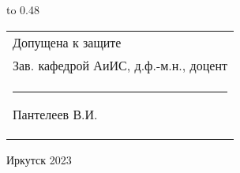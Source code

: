 \vspace{0.8cm}

{
	\noindent\hbox to 0.48\textwidth {%
		\mbox{ } \hfil} %
	\begin{tabular}[t]{l}
		Допущена к защите\\
		Зав. кафедрой АиИС, д.ф.-м.н., доцент \\
		\rule{2.7cm}{0.5pt} Пантелеев В.И.
	\end{tabular}		
}

\vspace{0.8cm}

\vfill 
\noindent
\begin{minipage}{\textwidth}
	\centering	Иркутск 2023
\end{minipage}